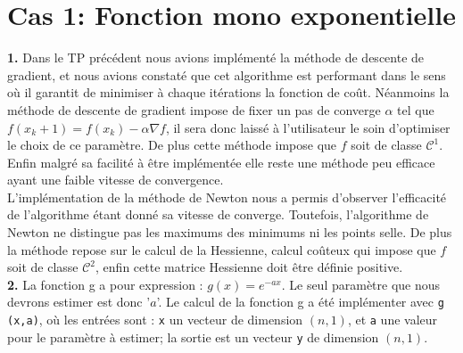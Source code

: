 \documentclass[12pt]{article}
\begin{document}
\newpage 


\newpage

\begin{center}
\end{center}
\vspace{0.5cm}

\section*{\color{brick} Cas 1:  Fonction mono exponentielle}
\textbf{\color{brick}1.} 
Dans le TP précédent nous avions implémenté la méthode de descente de gradient, et nous avions constaté que cet algorithme est performant dans le sens où il garantit de minimiser à chaque itérations la fonction de coût. Néanmoins la méthode de descente de gradient impose de fixer un pas de converge $\alpha$ tel que $f(x_k+1) = f(x_k) - \alpha \nabla f $, il sera donc laissé à l'utilisateur le soin d'optimiser le choix de ce paramètre. De plus cette méthode impose que $f$ soit de classe $\mathcal{C}^1$. Enfin malgré sa facilité à être implémentée elle reste une méthode peu efficace ayant une faible vitesse de convergence.\\
L'implémentation de la méthode de Newton nous a permis d'observer l'efficacité de l'algorithme étant donné sa vitesse de converge. Toutefois, l'algorithme de Newton ne distingue pas les maximums des minimums ni les points selle. De plus la méthode repose sur le calcul de la Hessienne, calcul coûteux qui impose que $f$ soit de classe $\mathcal{C}^2$, enfin cette matrice Hessienne doit être définie positive.\\

\textbf{\color{brick}2.} La fonction g a pour expression : $g(x) = e ^{-ax}$. Le seul paramètre que nous devrons estimer est donc '$a$'. Le calcul de la fonction g a été implémenter avec \verb|g (x,a)|, où les entrées sont : \verb|x| un vecteur de dimension $(n,1)$, et \verb|a| une valeur pour le paramètre à estimer; la sortie est un vecteur \verb|y| de dimension $(n,1)$. \\
\end{document}
